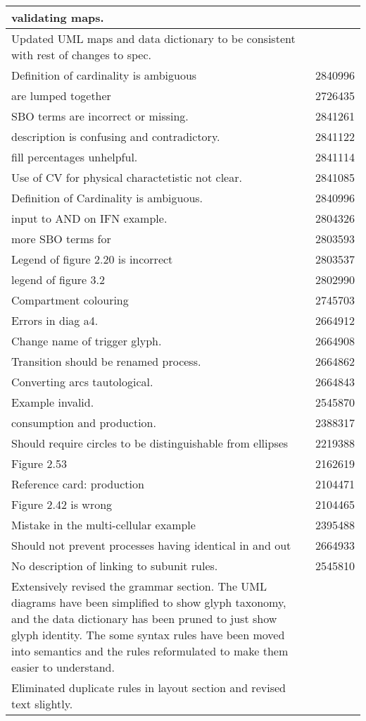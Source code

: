 \begin{center}
\begin{supertabular}{|p{12cm}|c|}
validating maps. & \\\hline
Updated UML maps and data dictionary  to be consistent with rest
of changes to spec. & \\\hline
Definition of cardinality is ambiguous & 2840996 \\\hline
{} are lumped together & 2726435 \\\hline
SBO terms are incorrect or missing. & 2841261 \\\hline
{} description is confusing and contradictory. & 2841122
\\\hline
{} fill percentages unhelpful. & 2841114 \\\hline
Use of CV for physical charactetistic not clear. & 2841085 \\\hline
Definition of Cardinality is ambiguous. & 2840996 \\\hline
input to AND on IFN example. & 2804326 \\\hline
more SBO terms for  & 2803593 \\\hline
Legend of figure 2.20 is incorrect & 2803537 \\\hline
legend of figure 3.2 & 2802990 \\\hline
Compartment colouring & 2745703 \\\hline
Errors in diag a4. & 2664912 \\\hline
Change name of trigger glyph. & 2664908 \\\hline
Transition should be renamed process. & 2664862 \\\hline
Converting arcs tautological. & 2664843 \\\hline
Example invalid. & 2545870 \\\hline
consumption and production. & 2388317 \\\hline
Should require circles to be distinguishable from ellipses & 2219388
\\\hline
Figure 2.53 & 2162619 \\\hline
Reference card: production & 2104471 \\\hline
Figure 2.42 is wrong & 2104465 \\\hline
Mistake in the multi-cellular example  & 2395488 \\\hline
Should not prevent processes having identical in and out & 2664933
\\\hline
No description of linking to subunit rules. & 2545810 \\\hline
Extensively revised the grammar section. The UML diagrams have been simplified to show glyph taxonomy, and the data dictionary has been pruned to just show glyph identity. The some syntax rules have been moved into semantics and the rules reformulated to make them easier to understand. & \\\hline
Eliminated duplicate rules in layout section and revised text slightly. & \\\hline
\end{supertabular}
\end{center}
